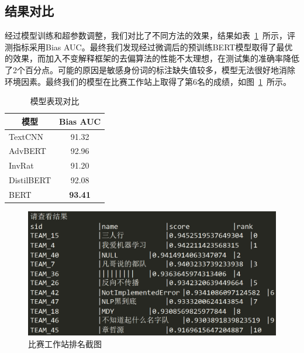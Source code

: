 \subsection{结果对比}

经过模型训练和超参数调整，我们对比了不同方法的效果，结果如表~\ref{tab:results}~所示，评测指标采用Bias AUC。最终我们发现经过微调后的预训练BERT模型取得了最优的效果，而加入不变解释框架的去偏算法的性能不太理想，在测试集的准确率降低了2个百分点。可能的原因是敏感身份词的标注缺失值较多，模型无法很好地消除环境因素。最终我们的模型在比赛工作站上取得了第6名的成绩，如图~\ref{fig:rank}~所示。

\begin{table}[htbp]
    \centering
    \begin{tabular}{lc}
        \toprule
        \multicolumn{1}{c}{模型} & Bias AUC \\
        \midrule
        TextCNN & 91.32 \\
        AdvBERT & 92.96 \\
        InvRat & 91.20 \\
        DistilBERT & 92.08 \\
        BERT & {\bf 93.41} \\
        \bottomrule
    \end{tabular}
    \caption{模型表现对比}
    \label{tab:results}
\end{table}

\begin{figure}[htbp]
    \centering
    \includegraphics[width=.8\textwidth]{figs/rank.png}
    \caption{比赛工作站排名截图}
    \label{fig:rank}
\end{figure}

